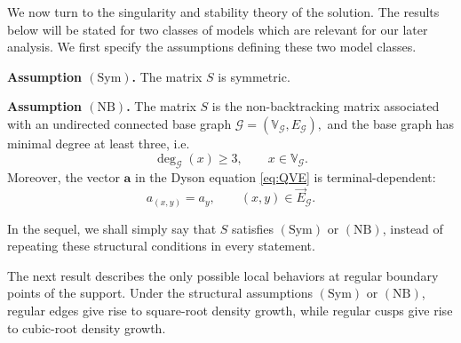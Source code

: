 \documentclass[11pt,twoside, a4paper]{article}
\numberwithin{equation}{section}
\numberwithin{figure}{section}
\theoremstyle{plain} %
\theoremstyle{definition}
\theoremstyle{remark}
\newcommand{\1} {\mspace{1 mu}}
\newcommand{\2} {\mspace{2 mu}}
\begin{document}
\medskip





We now turn to the singularity and stability theory of the solution. The
results below will be stated for two classes of models which are relevant for
our later analysis. We first specify the assumptions defining these two model
classes.




\noindent\textbf{Assumption \((\mathrm{Sym})\).}
The matrix \(S\) is symmetric.

\medskip

\noindent\textbf{Assumption \((\mathrm{NB})\).}
The matrix \(S\) is the non-backtracking matrix associated with an undirected
connected base graph
$
\mathcal G=(\mathbb V_{\mathcal G},E_{\mathcal G}),
$
and the base graph has minimal degree at least three, i.e.
\[
\deg_{\mathcal G}(x)\ge 3,\qquad x\in\mathbb V_{\mathcal G}.
\]
Moreover, the vector \(\mathbf{a}\) in the Dyson equation \eqref{eq:QVE} is terminal-dependent: 
\[
a_{(x,y)}=a_y, \qquad (x,y)\in\vec E_{\mathcal G}.
\]

In the sequel, we shall simply say that \(S\) satisfies
\((\mathrm{Sym})\) or \((\mathrm{NB})\), instead of repeating these structural
conditions in every statement. 

\medskip


The next result describes the only possible local behaviors at regular
boundary points of the support. Under the structural
assumptions \(\mathrm{(Sym)}\) or \(\mathrm{(NB)}\), regular edges give rise to square-root
density growth, while regular cusps give rise to cubic-root
density growth.
\end{document}
